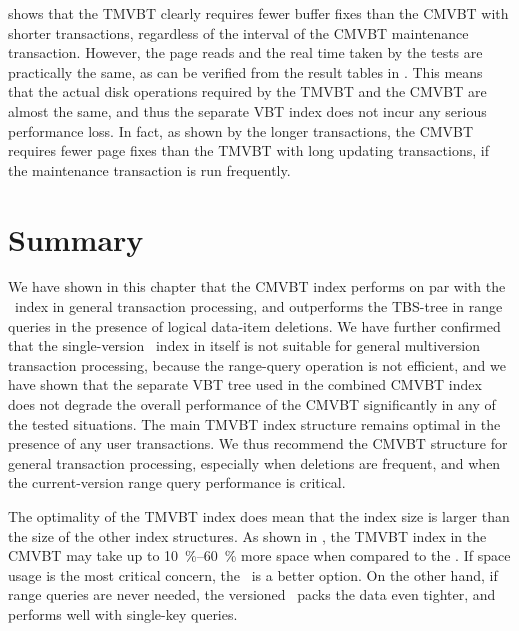  shows that the TMVBT clearly requires fewer buffer
fixes than the CMVBT with shorter transactions, regardless of the interval of
the CMVBT maintenance transaction. 
However, the page reads and the real time taken by the tests are
practically the same, as can be verified from the result tables in
.
This means that the actual disk  operations required by the TMVBT
and the CMVBT are almost the same, and thus the separate VBT index
does not incur any serious performance loss.
In fact, as shown by the longer transactions, the CMVBT requires fewer page
fixes than the TMVBT with long updating transactions, if the maintenance
transaction is run frequently.


\section{Summary}
\label{sec:performance:summary}

We have shown in this chapter that the CMVBT index performs on par with the
\TSBtree\ index in general transaction processing, and outperforms
the TBS-tree in range queries in the presence of logical data-item deletions.
We have further confirmed that the single-version \Btree\ index in itself is
not suitable for general multiversion transaction processing, because the
range-query operation is not efficient, and we have
shown that the separate VBT tree used in the combined CMVBT index does
not degrade the overall performance of the CMVBT significantly in any of the
tested situations. 
The main TMVBT index structure remains optimal in the presence of
any user transactions.
We thus recommend the CMVBT structure for general transaction processing,
especially when deletions are frequent, and when the current-version range
query performance is critical.

The optimality of the TMVBT index does mean that the index size is
larger than the size of the other index structures. 
As shown in , the TMVBT index in the CMVBT may take
up to \SIrange{10}{60}{\percent} more space when compared to the \TSBtree.
If space usage is the most critical concern, the \TSBtree\ is a better option. 
On the other hand, if range queries are never needed, the versioned \Btree\
packs the data even tighter, and performs well with single-key queries. 

